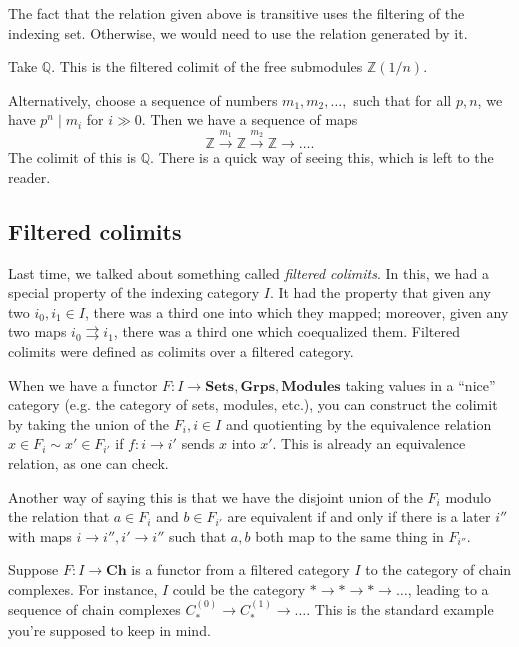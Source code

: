 The fact that the relation given above is transitive uses the filtering of the
indexing set. Otherwise, we would need to use the relation generated by it.

\begin{example} Take $\mathbb{Q}$. This is the filtered colimit of the free
submodules $\mathbb{Z}(1/n)$.

Alternatively, choose a sequence of numbers $m_1 , m_2, \dots, $ such that for
all $p, n$, we have $p^n \mid m_i$ for $i \gg 0$. Then we have a sequence of
maps \[ \mathbb{Z} \stackrel{m_1}{\to} \mathbb{Z}
\stackrel{m_2}{\to}\mathbb{Z} \to \dots. \] The colimit of this is
$\mathbb{Q}$. There is a quick way of seeing this, which is left to the
reader. \end{example} 

\subsection{Filtered colimits} Last time, we talked about something called
\emph{filtered colimits}. In this, we had a special property of the indexing
category $I$. It had the property that given any two $i_0, i_1 \in I$, there
was a third one into which they mapped; moreover, given any two maps $i_0
\rightrightarrows i_1$, there was a third one which coequalized them. Filtered
colimits were defined as colimits over a filtered category.

When we have a functor $F: I \to \mathbf{Sets}, \mathbf{Grps},
\mathbf{Modules}$ taking values in a ``nice'' category (e.g. the category of
sets, modules, etc.), you can construct the colimit by taking the union of the
$F_i, i \in I$ and quotienting by the equivalence relation $x \in F_i \sim x'
\in F_{i'}$ if $f: i \to i'$ sends $x$ into $x'$. This is already an
equivalence relation, as one can check.

Another way of saying this is that we have the disjoint union of the $F_i$
modulo the relation that $a \in F_i$ and $b \in F_{i'}$ are equivalent if and
only if there is a later $i''$ with maps $i \to i'', i' \to i''$ such that
$a,b$ both map to the same thing in $F_{i''}$.

Suppose $F: I \to \mathbf{Ch}$ is a functor from a filtered category $I$ to
the category of chain complexes. For instance, $I$ could be the category $\ast
\to \ast \to \ast \to \dots$, leading to a sequence of chain complexes
$C_*^{(0)}\to C_{*}^{(1)} \to \dots$. This is the standard example you're
supposed to keep in mind.

